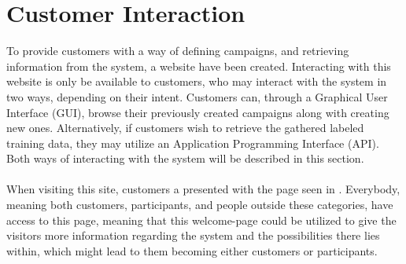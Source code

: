 
\section{Customer Interaction}
\label{sec:customer_interaction}

To provide customers with a way of defining campaigns, and retrieving information from the system, a website have been created. Interacting with this website is only be available to customers, who may interact with the system in two ways, depending on their intent.  Customers can, through a Graphical User Interface (GUI), browse their previously created campaigns along with creating new ones. Alternatively, if customers wish to retrieve the gathered labeled training data, they may utilize an Application Programming Interface (API). Both ways of interacting with the system will be described in this section.
\\\\
When visiting this site, customers a presented with the page seen in . Everybody, meaning both customers, participants, and people outside these categories, have access to this page, meaning that this welcome-page could be utilized to give the visitors more information regarding the system and the possibilities there lies within, which might lead to them becoming either customers or participants. 



 



